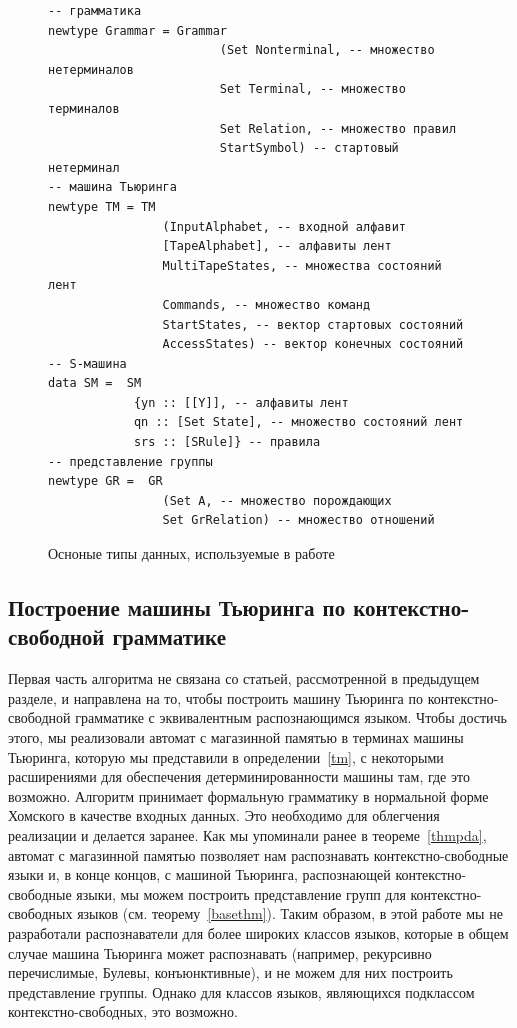 \documentclass[14pt]{matmex-diploma-custom}
\begin{document}
\begin{figure}[H]
\begin{verbatim}
-- грамматика
newtype Grammar = Grammar 
                        (Set Nonterminal, -- множество нетерминалов
                        Set Terminal, -- множество терминалов
                        Set Relation, -- множество правил
                        StartSymbol) -- стартовый нетерминал
-- машина Тьюринга                        
newtype TM = TM 
                (InputAlphabet, -- входной алфавит
                [TapeAlphabet], -- алфавиты лент
                MultiTapeStates, -- множества состояний лент
                Commands, -- множество команд
                StartStates, -- вектор стартовых состояний
                AccessStates) -- вектор конечных состояний
-- S-машина                
data SM =  SM 
            {yn :: [[Y]], -- алфавиты лент
            qn :: [Set State], -- множество состояний лент
            srs :: [SRule]} -- правила
-- представление группы        
newtype GR =  GR 
                (Set A, -- множество порождающих
                Set GrRelation) -- множество отношений
\end{verbatim}
\caption{Осноные типы данных, используемые в работе}
\label{fig:types}
\end{figure}

\subsection{Построение машины Тьюринга по контекстно-свободной грамматике}
Первая часть алгоритма не связана со статьей, рассмотренной в предыдущем разделе, 
и направлена на то, чтобы построить машину Тьюринга по контекстно-свободной грамматике 
с эквивалентным распознающимся языком.
Чтобы достичь этого, мы реализовали автомат с магазинной памятью в терминах машины Тьюринга, 
которую мы представили в определении~\ref{tm}, с некоторыми 
расширениями для обеспечения детерминированности машины там, где это возможно.
Алгоритм принимает формальную грамматику в нормальной форме Хомского в качестве входных данных.
Это необходимо для облегчения реализации и делается заранее.
Как мы упоминали ранее в теореме~\ref{thmpda}, автомат с магазинной памятью позволяет
нам распознавать контекстно-свободные языки и, в конце концов, с машиной Тьюринга, распознающей
контекстно-свободные языки, мы можем построить представление групп для контекстно-свободных языков
(см. теорему~\ref{basethm}). 
Таким образом, в этой работе мы не разработали распознаватели для более 
широких классов языков, которые в общем случае машина Тьюринга может распознавать 
(например, рекурсивно перечислимые, Булевы, конъюнктивные), и не можем для них 
построить представление группы. Однако для классов языков, являющихся подклассом 
контекстно-свободных, это возможно. 
\end{document}
